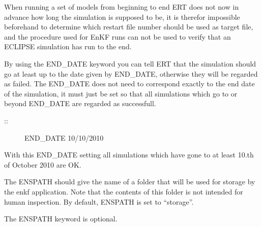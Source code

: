 \documentclass[a4paper,10pt,english]{sphinxmanual}
\begin{document}
\begin{sphinxShadowBox}

When running a set of models from beginning to end ERT does
not now in advance how long the simulation is supposed to be,
it is therefor impossible beforehand to determine which
restart file number should be used as target file, and the
procedure used for EnKF runs can not be used to verify that an
ECLIPSE simulation has run to the end.

By using the END\_DATE keyword you can tell ERT that the
simulation should go at least up to the date given by
END\_DATE, otherwise they will be regarded as failed. The
END\_DATE does not need to correspond exactly to the end date
of the simulation, it must just be set so that all simulations
which go to or beyond END\_DATE are regarded as successfull.

\begin{description}
\item[{::}] \leavevmode
END\_DATE  10/10/2010

\end{description}

With this END\_DATE setting all simulations which have gone to
at least 10.th of October 2010 are OK.
\end{sphinxShadowBox}
\label{\detokenize{keywords/index:enspath}}
\begin{sphinxShadowBox}

The ENSPATH should give the name of a folder that will be used
for storage by the enkf application. Note that the contents of
this folder is not intended for human inspection. By default,
ENSPATH is set to “storage”.


%
\begin{sphinxVerbatim}[commandchars=\\\{\}]
     
 
\end{sphinxVerbatim}

The ENSPATH keyword is optional.
\end{sphinxShadowBox}
\label{\detokenize{keywords/index:history-source}}
\end{document}
